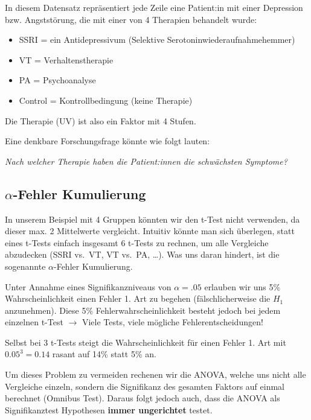\documentclass[
]{book}
\providecommand{\tightlist}{%
  \setlength{\itemsep}{0pt}\setlength{\parskip}{0pt}}
\begin{document}
In diesem Datensatz repräsentiert jede Zeile eine Patient:in mit einer Depression bzw. Angststörung, die mit einer von 4 Therapien behandelt wurde:

\begin{itemize}
\tightlist
\item
  SSRI = ein Antidepressivum (Selektive Serotoninwiederaufnahmehemmer)
\item
  VT = Verhaltenstherapie
\item
  PA = Psychoanalyse
\item
  Control = Kontrollbedingung (keine Therapie)
\end{itemize}

Die Therapie (UV) ist also ein Faktor mit 4 Stufen.

Eine denkbare Forschungsfrage könnte wie folgt lauten:

\emph{Nach welcher Therapie haben die Patient:innen die schwächsten Symptome?}

\hypertarget{alpha-fehler-kumulierung}{%
\subsection{\texorpdfstring{\(\alpha\)-Fehler Kumulierung}{\textbackslash alpha-Fehler Kumulierung}}\label{alpha-fehler-kumulierung}}

In unserem Beispiel mit 4 Gruppen könnten wir den t-Test nicht verwenden, da dieser max. 2 Mittelwerte vergleicht. Intuitiv könnte man sich überlegen, statt eines t-Tests einfach insgesamt 6 t-Tests zu rechnen, um alle Vergleiche abzudecken (SSRI vs.~VT, VT vs.~PA, \ldots). Was uns daran hindert, ist die sogenannte \(\alpha\)-Fehler Kumulierung.

Unter Annahme eines Signifikanzniveaus von \(\alpha=.05\) erlauben wir uns 5\% Wahrscheinlichkeit einen Fehler 1. Art zu begehen (fälschlicherweise die \(H_1\) anzunehmen). Diese 5\% Fehlerwahrscheinlichkeit besteht jedoch bei jedem einzelnen t-Test \(\rightarrow\) Viele Tests, viele mögliche Fehlerentscheidungen!

Selbst bei 3 t-Tests steigt die Wahrscheinlichkeit für einen Fehler 1. Art mit \(0.05^3=0.14\) rasant auf 14\% statt 5\% an.

Um dieses Problem zu vermeiden rechenen wir die ANOVA, welche uns nicht alle Vergleiche einzeln, sondern die Signifikanz des gesamten Faktors auf einmal berechnet (Omnibus Test). Daraus folgt jedoch auch, dass die ANOVA als Signifikanztest Hypothesen \textbf{immer ungerichtet} testet.
\end{document}

